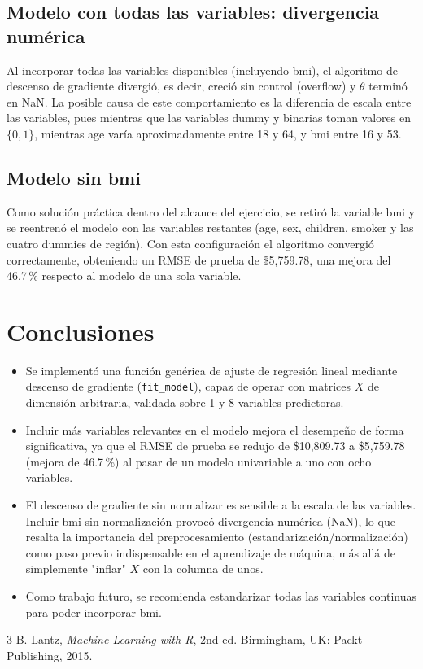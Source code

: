 \documentclass[journal]{IEEEtran}
\begin{document}
\subsection{Modelo con todas las variables: divergencia numérica}
Al incorporar todas las variables disponibles (incluyendo bmi), el algoritmo de descenso de gradiente divergió, es decir, creció sin control (overflow) y $\theta$ terminó en NaN. La posible causa de este comportamiento es la diferencia de escala entre las variables, pues mientras que las variables dummy y binarias toman valores en $\{0,1\}$, mientras age varía aproximadamente entre 18 y 64, y bmi entre 16 y 53.

\subsection{Modelo sin bmi}
Como solución práctica dentro del alcance del ejercicio, se retiró la variable bmi y se reentrenó el modelo con las variables restantes (age, sex, children, smoker y las cuatro dummies de región). Con esta configuración el algoritmo convergió correctamente, obteniendo un RMSE de prueba de \$5{,}759.78, una mejora del 46.7\,\% respecto al modelo de una sola variable.


\section{Conclusiones}

\begin{itemize}
    \item Se implementó una función genérica de ajuste de regresión lineal mediante descenso de gradiente (\texttt{fit\_model}), capaz de operar con matrices $X$ de dimensión arbitraria, validada sobre 1 y 8 variables predictoras.
    \item Incluir más variables relevantes en el modelo mejora el desempeño de forma significativa, ya que el RMSE de prueba se redujo de \$10{,}809.73 a \$5{,}759.78 (mejora de 46.7\,\%) al pasar de un modelo univariable a uno con ocho variables.
    \item El descenso de gradiente sin normalizar es sensible a la escala de las variables. Incluir bmi sin normalización provocó divergencia numérica (NaN), lo que resalta la importancia del preprocesamiento (estandarización/normalización) como paso previo indispensable en el aprendizaje de máquina, más allá de simplemente "inflar" $X$ con la columna de unos.
    \item Como trabajo futuro, se recomienda estandarizar todas las variables continuas para poder incorporar bmi.
\end{itemize}

\begin{thebibliography}{3}
 B. Lantz, \emph{Machine Learning with R}, 2nd ed. Birmingham, UK: Packt Publishing, 2015.

\end{thebibliography}
\end{document}
